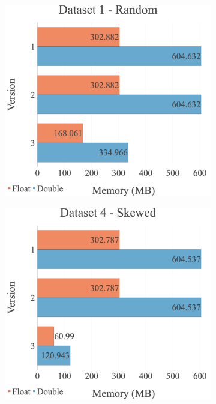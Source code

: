 \begin{figure}[H]
\centering
\begin{subfigure}{.49\textwidth}
  \centering
  \includegraphics[width=1\linewidth]{img/experiments/mem-multi-versions-1_RAND.png}
\end{subfigure}
\begin{subfigure}{.49\textwidth}
  \centering
  \includegraphics[width=1\linewidth]{img/experiments/mem-multi-versions-4_SKEWED.png}

\end{subfigure}
\end{figure}

